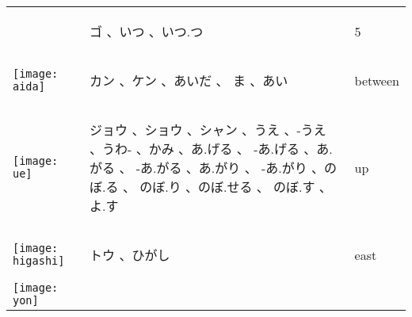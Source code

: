 \documentclass[a4paper,12pt]{extarticle}
\begin{document}
\begin{longtable}{|lp{6cm}p{4cm}|}
\begin{minipage}{0.3\textwidth}
{		}
	\end{minipage}
	                                   &
	\begin{CJK}{UTF8}{min} ゴ 、いつ 、いつ.つ\end{CJK}
	                                   &
	5
	\\
	\begin{minipage}{0.3\textwidth}
		\centerline{
			\texttt{[image: aida]}
		}
	\end{minipage}
	                                   &
	\begin{CJK}{UTF8}{min} カン 、ケン 、あいだ 、 ま 、あい\end{CJK}
	                                   &
	between
	\\
	\begin{minipage}{0.3\textwidth}
		\centerline{
			\texttt{[image: ue]}
		}
	\end{minipage}
	                                   &
	\begin{CJK}{UTF8}{min} ジョウ 、ショウ 、シャン 、うえ 、-うえ  、うわ- 、かみ 、あ.げる 、 -あ.げる 、あ.がる 、 -あ.がる 、あ.がり 、 -あ.がり 、のぼ.る 、 のぼ.り 、のぼ.せる 、 のぼ.す 、よ.す\end{CJK}
	                                   &
	up
	\\
	\begin{minipage}{0.3\textwidth}
		\centerline{
			\texttt{[image: higashi]}
		}
	\end{minipage}
	                                   &
	\begin{CJK}{UTF8}{min} トウ 、ひがし\end{CJK}
	                                   &
	east
	\\
	\begin{minipage}{0.3\textwidth}
		\centerline{
			\texttt{[image: yon]}
		}
	\end{minipage}

\end{longtable}
\end{document}
